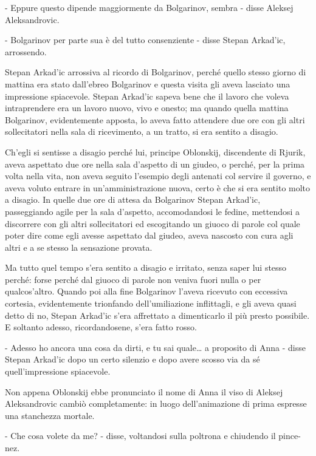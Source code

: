 - Eppure questo dipende maggiormente da Bolgarinov, sembra - disse Aleksej Aleksandrovic. 

- Bolgarinov per parte sua è del tutto consenziente - disse Stepan Arkad'ic, arrossendo. 

Stepan Arkad'ic arrossiva al ricordo di Bolgarinov, perché quello stesso giorno di mattina era stato dall'ebreo Bolgarinov e questa visita gli aveva lasciato una impressione spiacevole. Stepan Arkad'ic sapeva bene che il lavoro che voleva intraprendere era un lavoro nuovo, vivo e onesto; ma quando quella mattina Bolgarinov, evidentemente apposta, lo aveva fatto attendere due ore con gli altri sollecitatori nella sala di ricevimento, a un tratto, si era sentito a disagio. 

Ch'egli si sentisse a disagio perché lui, principe Oblonskij, discendente di Rjurik, aveva aspettato due ore nella sala d'aspetto di un giudeo, o perché, per la prima volta nella vita, non aveva seguito l'esempio degli antenati col servire il governo, e aveva voluto entrare in un'amministrazione nuova, certo è che si era sentito molto a disagio. In quelle due ore di attesa da Bolgarinov Stepan Arkad'ic, passeggiando agile per la sala d'aspetto, accomodandosi le fedine, mettendosi a discorrere con gli altri sollecitatori ed escogitando un giuoco di parole col quale poter dire come egli avesse aspettato dal giudeo, aveva nascosto con cura agli altri e a se stesso la sensazione provata. 

Ma tutto quel tempo s'era sentito a disagio e irritato, senza saper lui stesso perché: forse perché dal giuoco di parole non veniva fuori nulla o per qualcos'altro. Quando poi alla fine Bolgarinov l'aveva ricevuto con eccessiva cortesia, evidentemente trionfando dell'umiliazione inflittagli, e gli aveva quasi detto di no, Stepan Arkad'ic s'era affrettato a dimenticarlo il più presto possibile. E soltanto adesso, ricordandosene, s'era fatto rosso. 

\label{xviii-6} 

- Adesso ho ancora una cosa da dirti, e tu sai quale\ldots{} a proposito di Anna - disse Stepan Arkad'ic dopo un certo silenzio e dopo avere scosso via da sé quell'impressione spiacevole. 

Non appena Oblonskij ebbe pronunciato il nome di Anna il viso di Aleksej Aleksandrovic cambiò completamente: in luogo dell'animazione di prima espresse una stanchezza mortale. 

- Che cosa volete da me? - disse, voltandosi sulla poltrona e chiudendo il pince-nez. 

